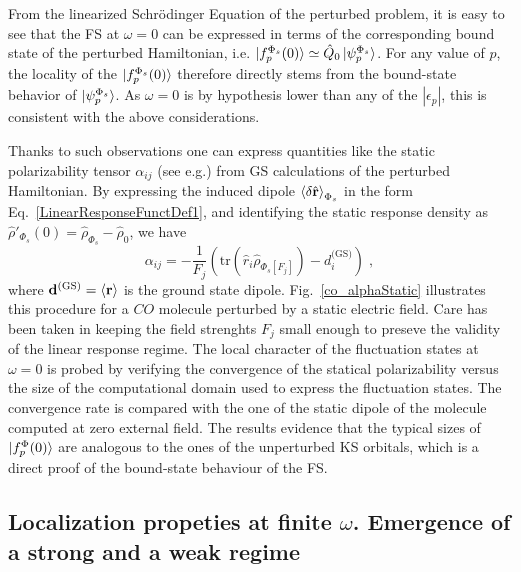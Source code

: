 \documentclass[reprint,aps,prb]{revtex4-1}
\newcommand{\eps}{\epsilon}
\newcommand{\be}{\begin{equation}}
\newcommand{\ee}{\end{equation}}
\newcommand{\op}[1]{\hat {#1}}
\newcommand{\trace}[1]{\mathrm{tr}\left(#1\right)}
\newcommand{\dmnot}{\op{\rho}_0}
\newcommand{\dm}{\op{\rho}}
\begin{document}
From the linearized Schr\"odinger Equation of the perturbed problem, it is easy to see that the FS at $\omega=0$ can be expressed
in terms of the corresponding bound state of the perturbed Hamiltonian, i.e.
$\ket{f_p^{\Phi_s}(0)} \simeq \op Q_0 \ket{\psi_p^{\Phi_s}}$.
For any value of $p$, the locality of the $\ket{f_p^{\Phi_s}(0)}$ therefore directly stems from the
bound-state behavior of $\ket{\psi_p^{\Phi_s}}$. As $\omega=0$ is by hypothesis
lower than any of the $|\eps_p|$, this is consistent with the above considerations.

Thanks to such observations one can express quantities like the static polarizability tensor $\alpha_{ij}$ (see e.g.\cite{DebElecField}) from GS calculations of the perturbed Hamiltonian.
By expressing the induced dipole $\braket{\delta \op{\mathbf r}}_{\Phi_s}$ in the form Eq.~\eqref{LinearResponseFunctDef1}, and identifying the static response density as $\dm'_{\Phi_s}(0) = \dm_{\Phi_s} -\dmnot $, we have
\be \label{staticalpha}
\alpha_{ij} =
-\frac{1}{F_j} \left(\trace{\op r_i \dm_{\Phi_s[F_j]}} - d^{\text{(GS)}}_i \right)\;,
\ee
where $\mathbf d^\text{(GS)}=\braket{\mathbf r}$ is the ground state dipole.
Fig.~\eqref{co_alphaStatic} illustrates this procedure for a $CO$ molecule
perturbed by a static electric field.
Care has been taken in keeping the field strenghts $F_j$ small enough to
preseve the validity of the linear response regime.
The local character of the fluctuation states at $\omega=0$ is
probed by verifying the convergence of the statical polarizability versus
the size of the computational domain used to express the fluctuation states. The convergence rate is compared with the
one of the static dipole of the molecule computed at zero external field.
The results evidence that the typical sizes of $\ket{f^\Phi_p(0)}$ are analogous to the ones of the unperturbed KS orbitals, which is a direct proof of the bound-state behaviour of the FS.


\subsection{Localization propeties at finite $\omega$. Emergence of a strong and a weak regime}

\end{document}
